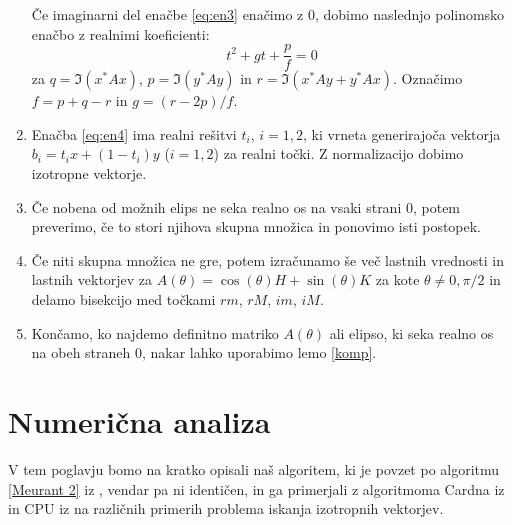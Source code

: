 \documentclass[12pt,a4paper]{amsart}
\theoremstyle{definition}
\theoremstyle{plain}
\begin{document}
\begin{enumerate}[1.]
Če imaginarni del enačbe \eqref{eq:en3} enačimo z 0, dobimo naslednjo polinomsko enačbo z realnimi koeficienti:
\begin{equation}
t^2+gt+\frac{p}{f}=0 \label{eq:en4}
\end{equation}
za $q=\Im(x^\ast Ax)$, $p=\Im(y^\ast Ay)$ in $r=\Im(x^\ast  Ay + y^\ast Ax)$. Označimo $f=p+q-r$ in $g=(r-2p)/f$.
\item  Enačba \eqref{eq:en4} ima realni rešitvi $t_i$, $i=1,2$, ki vrneta generirajoča vektorja $b_i=t_ix+(1-t_i)y$ ($i=1,2$) za realni točki. Z normalizacijo dobimo izotropne vektorje. %
\item Če nobena od možnih elips ne seka realno os na vsaki strani 0, potem preverimo, če to stori njihova skupna množica in ponovimo isti postopek.
\item Če niti skupna množica ne gre, potem izračunamo še več lastnih vrednosti in lastnih vektorjev za $A(\theta)=\cos(\theta)H+\sin(\theta)K$ za kote $\theta \not =0,\pi/2$ in delamo bisekcijo med točkami $rm$, $rM$, $im$, $iM$.
\item Končamo, ko najdemo definitno matriko $A(\theta)$ ali elipso, ki seka realno os na obeh straneh 0, nakar lahko uporabimo lemo \ref{komp}.
\end{enumerate}
\section{Numerična analiza}
V tem poglavju bomo na kratko opisali naš algoritem, ki je povzet po algoritmu \ref{Meurant 2} iz \cite{meurant}, vendar pa ni identičen, in ga primerjali z algoritmoma Cardna iz \cite{carden_alg} in CPU iz \cite{trije_alg} na različnih primerih problema iskanja izotropnih vektorjev. 
\end{document}

